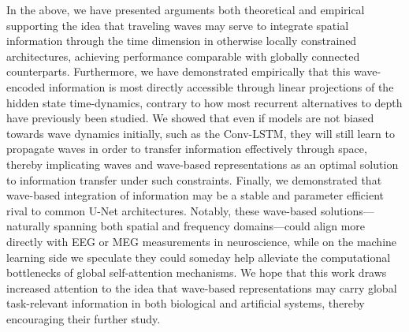 In the above, we have presented arguments both theoretical and empirical supporting the idea that traveling waves may serve to integrate spatial information through the time dimension in otherwise locally constrained architectures, achieving performance comparable with globally connected counterparts. Furthermore, we have demonstrated empirically that this wave-encoded information is most directly accessible through linear projections of the hidden state time-dynamics, contrary to how most recurrent alternatives to depth have previously been studied. We showed that even if models are not biased towards wave dynamics initially, such as the Conv-LSTM, they will still learn to propagate waves in order to transfer information effectively through space, thereby implicating waves and wave-based representations as an optimal solution to information transfer under such constraints. Finally, we demonstrated that wave-based integration of information may be a stable and parameter efficient rival to common U-Net architectures. Notably, these wave-based solutions—naturally spanning both spatial and frequency domains—could align more directly with EEG or MEG measurements in neuroscience, while on the machine learning side we speculate they could someday help alleviate the computational bottlenecks of global self-attention mechanisms. We hope that this work draws increased attention to the idea that wave-based representations may carry global task-relevant information in both biological and artificial systems, thereby encouraging their further study.